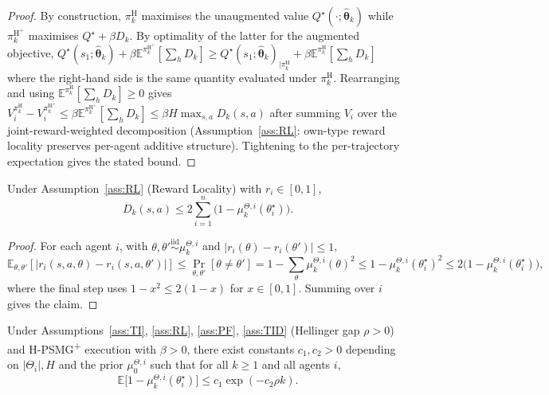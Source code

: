 \begin{proof}
By construction, $\pi_k^{\mathrm{H}}$ maximises the unaugmented value $Q^\star(\cdot; \hat{\boldsymbol\theta}_k)$ while $\pi_k^{\mathrm{H}^+}$ maximises $Q^\star + \beta D_k$. By optimality of the latter for the augmented objective,
$Q^\star(s_1; \hat{\boldsymbol\theta}_k) + \beta \mathbb{E}^{\pi_k^{\mathrm{H}^+}}[\sum_h D_k] \geq Q^\star(s_1; \hat{\boldsymbol\theta}_k)_{|\pi_k^{\mathrm{H}}} + \beta \mathbb{E}^{\pi_k^{\mathrm{H}}}[\sum_h D_k]$
where the right-hand side is the same quantity evaluated under $\pi_k^{\mathrm{H}}$. Rearranging and using $\mathbb{E}^{\pi_k^{\mathrm{H}}}[\sum_h D_k] \geq 0$ gives
$V_i^{\pi_k^{\mathrm{H}}} - V_i^{\pi_k^{\mathrm{H}^+}} \leq \beta \mathbb{E}^{\pi_k^{\mathrm{H}^+}}[\sum_h D_k] \leq \beta H \max_{s, a} D_k(s, a)$
after summing $V_i$ over the joint-reward-weighted decomposition (Assumption~\ref{ass:RL}: own-type reward locality preserves per-agent additive structure). Tightening to the per-trajectory expectation gives the stated bound.
\end{proof}

\begin{lemma}
\label{lem:collision-bound}
Under Assumption~\ref{ass:RL} (Reward Locality) with $r_i \in [0, 1]$,
\begin{equation}
D_k(s, a) \leq 2 \sum_{i=1}^n \big(1 - \mu_k^{\Theta, i}(\theta_i^\star)\big).
\end{equation}
\end{lemma}

\begin{proof}
For each agent $i$, with $\theta, \theta' \stackrel{\mathrm{iid}}{\sim} \mu_k^{\Theta, i}$ and $|r_i(\theta) - r_i(\theta')| \leq 1$,
\begin{equation}
\mathbb{E}_{\theta, \theta'}[|r_i(s,a,\theta) - r_i(s,a,\theta')|] \leq \Pr_{\theta, \theta'}[\theta \neq \theta'] = 1 - \sum_{\theta} \mu_k^{\Theta, i}(\theta)^2 \leq 1 - \mu_k^{\Theta, i}(\theta_i^\star)^2 \leq 2\big(1 - \mu_k^{\Theta, i}(\theta_i^\star)\big),
\end{equation}
where the final step uses $1 - x^2 \leq 2(1 - x)$ for $x \in [0, 1]$. Summing over $i$ gives the claim.
\end{proof}

\begin{lemma}
\label{lem:tid-concentration}
Under Assumptions~\ref{ass:TI}, \ref{ass:RL}, \ref{ass:PF}, \ref{ass:TID} (Hellinger gap $\rho > 0$) and H-PSMG\textsuperscript{+} execution with $\beta > 0$, there exist constants $c_1, c_2 > 0$ depending on $|\Theta_i|, H$ and the prior $\mu_0^{\Theta, i}$ such that for all $k \geq 1$ and all agents $i$,
\begin{equation}
\mathbb{E}\big[1 - \mu_k^{\Theta, i}(\theta_i^\star)\big] \leq c_1 \exp(-c_2 \rho k).
\end{equation}
\end{lemma}

